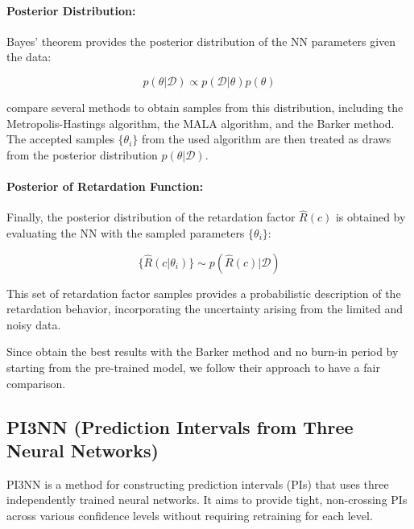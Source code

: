 \paragraph{Posterior Distribution:}

Bayes' theorem provides the posterior distribution of the NN parameters given the data:

\begin{equation*}
p(\theta | \mathcal{D}) \propto p(\mathcal{D} | \theta) p(\theta)
\end{equation*}

\cite{finn} compare several methods to obtain samples from this distribution, including the Metropolis-Hastings algorithm, the MALA algorithm, and the Barker method. The accepted samples $\{\theta_i\}$ from the used algorithm are then treated as draws from the posterior distribution $p(\theta | \mathcal{D})$.

\paragraph{Posterior of Retardation Function:}

Finally, the posterior distribution of the retardation factor $\hat{R}(c)$ is obtained by evaluating the NN with the sampled parameters $\{\theta_i\}$:

\begin{equation*}
\{\hat{R}(c | \theta_i)\} \sim p(\hat{R}(c) | \mathcal{D})
\end{equation*}

This set of retardation factor samples provides a probabilistic description of the retardation behavior, incorporating the uncertainty arising from the limited and noisy data.

Since \cite{finn} obtain the best results with the Barker method and no burn-in period by starting from the pre-trained model, we follow their approach to have a fair comparison.



\subsection{PI3NN (Prediction Intervals from Three Neural Networks)}
PI3NN \cite{pi3nn} is a method for constructing prediction intervals (PIs) that uses three independently trained neural networks. It aims to provide tight, non-crossing PIs across various confidence levels without requiring retraining for each level.

